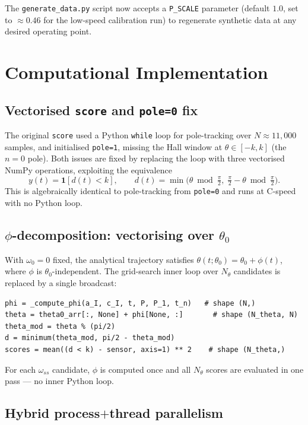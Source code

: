 \documentclass[11pt,a4paper]{article}
\begin{document}
The \texttt{generate\_data.py} script now accepts a \texttt{P\_SCALE}
parameter (default $1.0$, set to $\approx 0.46$ for the low-speed
calibration run) to regenerate synthetic data at any desired operating point.

\section{Computational Implementation}

\subsection{Vectorised \texttt{score} and \texttt{pole=0} fix}

The original \texttt{score} used a Python \texttt{while} loop for
pole-tracking over $N\approx11{,}000$ samples, and initialised
\texttt{pole=1}, missing the Hall window at $\theta\in[-k,k]$ (the $n=0$
pole).  Both issues are fixed by replacing the loop with three vectorised
NumPy operations, exploiting the equivalence
\[
  y(t) = \mathbf{1}[d(t) < k], \qquad
  d(t) = \min\!\bigl(\theta\bmod\tfrac{\pi}{2},\;
                     \tfrac{\pi}{2} - \theta\bmod\tfrac{\pi}{2}\bigr).
\]
This is algebraically identical to pole-tracking from \texttt{pole=0} and
runs at C-speed with no Python loop.

\subsection{$\phi$-decomposition: vectorising over $\theta_0$}

With $\omega_0 = 0$ fixed, the analytical trajectory satisfies
$\theta(t;\theta_0) = \theta_0 + \phi(t)$, where $\phi$ is
$\theta_0$-independent.  The grid-search inner loop over $N_{\theta}$
candidates is replaced by a single broadcast:
\begin{verbatim}
phi = _compute_phi(a_I, c_I, t, P, P_1, t_n)   # shape (N,)
theta = theta0_arr[:, None] + phi[None, :]       # shape (N_theta, N)
theta_mod = theta % (pi/2)
d = minimum(theta_mod, pi/2 - theta_mod)
scores = mean((d < k) - sensor, axis=1) ** 2    # shape (N_theta,)
\end{verbatim}
For each $\omega_{ss}$ candidate, $\phi$ is computed once and all
$N_\theta$ scores are evaluated in one pass — no inner Python loop.

\subsection{Hybrid process$+$thread parallelism}
\end{document}
